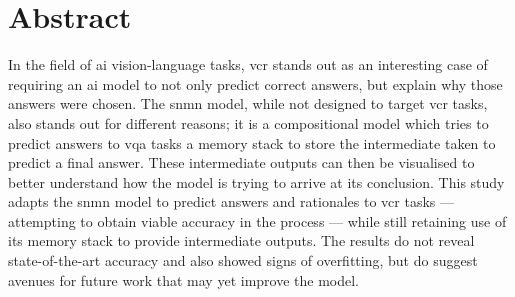\chapter*{Abstract}

In the field of \gls{ai} vision-language tasks, \gls{vcr} stands out as an interesting case of requiring an \gls{ai} model to not only predict correct answers, but explain why those answers were chosen.
The \gls{snmn} model, while not designed to target \gls{vcr} tasks, also stands out for different reasons; it is a compositional model which tries to predict answers to \gls{vqa} tasks a memory stack to store the intermediate taken to predict a final answer.
These intermediate outputs can then be visualised to better understand how the model is trying to arrive at its conclusion.
This study adapts the \gls{snmn} model to predict answers and rationales to \gls{vcr} tasks --- attempting to obtain viable accuracy in the process --- while still retaining use of its memory stack to provide intermediate outputs.
The results do not reveal state-of-the-art accuracy and also showed signs of overfitting, but do suggest avenues for future work that may yet improve the model.
